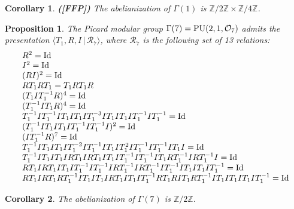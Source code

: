 \documentclass{article}[12pt]
\newcommand{\Z}{\mathbb{Z}}
\newcommand{\la}{\langle}
\newcommand{\ra}{\rangle}
\newtheorem{cor}{Corollary}
\newtheorem{prop}{Proposition}%
\begin{document}
\begin{cor}{\bf ([FFP])} The abelianization of $\Gamma(1)$ is $\Z/2\Z \times \Z/4\Z$.
\end{cor}



\begin{prop}\label{presentationd=7} The Picard modular group $\Gamma(7)={\rm PU}(2,1,\mathcal{O}_7)$ admits the presentation $\la T_1, R, I\, | \, \mathcal{R}_7 \ra$, where $\mathcal{R}_7$ is the following set of 13 relations:
$$\begin{array}{l}
R^2 = {\rm Id} \\
    I^2 = {\rm Id} \\
    (R  I)^2 = {\rm Id} \\
    R  T_1  R  T_1 = T_1  R  T_1 R  \\
    (T_1  I  T_1^{-1}  R)^4 = {\rm Id} \\
    (T_1^{-1}  I  T_1  R)^4 = {\rm Id} \\
    T_1^{-1}  I  T_1^{-1}  I  T_1  I  T_1  I  T_1^{-3}  I  T_1 
    I  T_1  I  T_1^{-1}  I  T_1^{-1} = {\rm Id} \\
    (T_1^{-1}  I  T_1  I  T_1  I  T_1^{-1}  I  T_1^{-1}  I)^2 =
    {\rm Id} \\
    (I  T_1^{-1}  R)^7 = {\rm Id} \\
    T_1^{-1}  I  T_1  I  T_1  I  T_1^{-2}  I  T_1^{-1}  I  T_1 
    I  T_1^2  I  T_1^{-1}  I  T_1^{-1}  I  T_1  I = {\rm Id} \\
    T_1^{-1}  I  T_1  I  T_1  I  R  T_1  I  R  T_1  I 
    T_1  I  T_1^{-1}  I  T_1^{-1}  I  T_1  R  T_1^{-1}  I  R 
    T_1^{-1}  I = {\rm Id} \\
    R  T_1  I  R  T_1  I  T_1  I  T_1^{-1}  I  T_1^{-1}  I
     R  T_1^{-1}  I  R  T_1^{-1}  I  T_1^{-1}  I  T_1  I  T_1 
    I  T_1^{-1} = {\rm Id} \\
    R  T_1  I  R  T_1  R  T_1^{-1}  I  T_1  I  T_1  I 
    R  T_1  I  T_1  I  T_1^{-1}  R  T_1  R  I  T_1  R 
    T_1^{-1}  I  T_1  I  T_1  I  T_1  I  T_1^{-1} = {\rm Id} 
 \end{array}$$
\end{prop}

\begin{cor} The abelianization of $\Gamma(7)$ is $\Z/2\Z$.
\end{cor}
\end{document}
